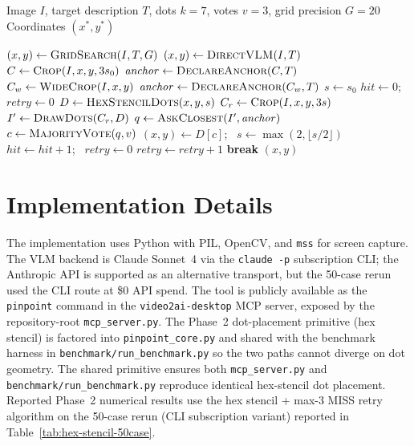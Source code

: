 \documentclass[sigconf,nonacm]{acmart}
\begin{document}
\begin{algorithm}[t]
\caption{Monte Carlo Pinpoint}
\label{alg:pinpoint}
\begin{algorithmic}[1]
\Require Image $I$, target description $T$, dots $k{=}7$,
  votes $v{=}3$, grid precision $G{=}20$
\Ensure Coordinates $(x^*, y^*)$

\State $(x, y) \gets \textsc{GridSearch}(I, T, G)$
  \State $(x, y) \gets \textsc{DirectVLM}(I, T)$
\EndIf
\State $C \gets \textsc{Crop}(I, x, y, 3 s_0)$
\State $\mathit{anchor} \gets \textsc{DeclareAnchor}(C, T)$
  \State $C_w \gets \textsc{WideCrop}(I, x, y)$
  \State $\mathit{anchor} \gets \textsc{DeclareAnchor}(C_w, T)$
\EndIf
\State $s \gets s_0$ 
\State $\mathit{hit} \gets 0$;~ $\mathit{retry} \gets 0$
  \State $D \gets \textsc{HexStencilDots}(x, y, s)$
  \State $C_r \gets \textsc{Crop}(I, x, y, 3s)$
  \State $I' \gets \textsc{DrawDots}(C_r, D)$
  \State $q \gets \textsc{AskClosest}(I', \mathit{anchor})$
  \State $c \gets \textsc{MajorityVote}(q, v)$
   
    \State $(x, y) \gets D[c]$;~
      $s \gets \max(2, \lfloor s / 2 \rfloor)$
    \State $\mathit{hit} \gets \mathit{hit} + 1$;~ $\mathit{retry} \gets 0$
  \Else{} 
    \State $\mathit{retry} \gets \mathit{retry} + 1$
      \State \textbf{break} 
    \EndIf
  \EndIf
\EndWhile
\State \Return $(x, y)$
\end{algorithmic}
\end{algorithm}

\section{Implementation Details}

The implementation uses Python with PIL, OpenCV, and \texttt{mss} for
screen capture.  The VLM backend is Claude Sonnet~4 via the
\texttt{claude -p} subscription CLI; the Anthropic API is
supported as an alternative transport, but the 50-case rerun used
the CLI route at \$0 API spend.  The tool is publicly available as
the \texttt{pinpoint} command
in the \texttt{video2ai-desktop} MCP server, exposed by the
repository-root \texttt{mcp\_server.py}.  The Phase~2 dot-placement
primitive (hex stencil) is factored into \texttt{pinpoint\_core.py}
and shared with the benchmark harness in
\texttt{benchmark/run\_benchmark.py} so the two paths cannot diverge
on dot geometry.  The shared primitive ensures both
\texttt{mcp\_server.py} and \texttt{benchmark/run\_benchmark.py}
reproduce identical hex-stencil dot placement.  Reported Phase~2
numerical results use the hex stencil + max-3 MISS retry algorithm
on the 50-case rerun (CLI subscription variant) reported in
Table~\ref{tab:hex-stencil-50case}.
\end{document}
